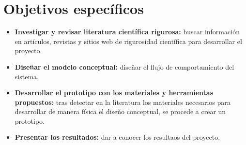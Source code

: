 \section{Objetivos específicos}
\begin{itemize}
  \item \textbf{Investigar y revisar literatura científica rigurosa:} buscar información en artículos, revistas y sitios web de rigurosidad científica para desarrollar el proyecto.
  \item \textbf{Diseñar el modelo conceptual:} diseñar el flujo de comportamiento del sistema.
  \item \textbf{Desarrollar el prototipo con los materiales y herramientas propuestos:} tras detectar en la literatura los materiales necesarios para desarrollar de manera física el diseño conceptual, se procede a crear un prototipo.
  \item \textbf{Presentar los resultados:} dar a conocer los resultaos del proyecto.
\end{itemize}